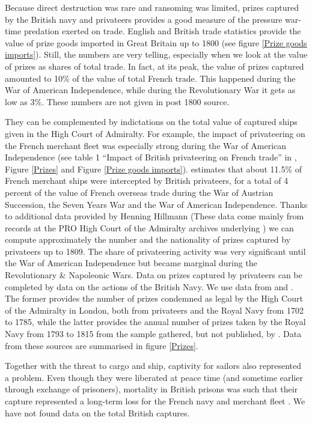\documentclass[12pt,a4paper,notitlepage,english]{article}
\begin{document}
Because direct destruction was rare and ransoming was limited, prizes captured by the British navy and privateers provides a good measure of the pressure war-time predation exerted on trade.
English and British trade statistics provide the value of prize goods imported in Great Britain up to 1800 (see figure \ref{Prize goods imports}).
Still, the numbers are very telling, especially when we look at the value of prizes as shares of total trade.
In fact, at its peak, the value of prizes captured amounted to 10\% of the value of total French trade.
This happened during the War of American Independence, while during the Revolutionary War it gets as low as 3\%.
These numbers are not given in post 1800 source.

They can be complemented by indictations on the total value of captured ships given in the High Court of Admiralty. For example, the impact of privateering on the French merchant fleet was especially strong during the War of American Independence (see table 1 ``Impact of British privateering on French trade'' in \cite{Hillmann2011}, Figure \ref{Prizes} and Figure \ref{Prize goods imports}).
\cite{Hillmann2011} estimates that about 11.5\% of French merchant ships were intercepted by British privateers, for a total of 4 percent of the value of French overseas trade during the War of Austrian Succession, the Seven Years War and the War of American Independence.
Thanks to additional data provided by Henning Hillmann (These data come mainly from records at the PRO High Court of the Admiralty archives underlying \cite{Hillmann2011}) we can compute approximately the number and the nationality of prizes captured by privateers up to 1809.
The share of privateering activity was very significant until the War of American Independence but became marginal during the Revolutionary \& Napoleonic Wars.
Data on prizes captured by privateers can be completed by data on the actions of the British Navy.
We use data from \cite{Starkey1990} and \cite{Benjamin2009}. 
The former provides the number of prizes condemned as legal by the High Court of the Admiralty in London, both from privateers and the Royal Navy from 1702 to 1785, while the latter provides the annual number of prizes taken by the Royal Navy from 1793 to 1815 from the sample gathered, but not published, by \cite{Hill1998}.
Data from these sources are summarised in figure \ref{Prizes}.




Together with the threat to cargo and ship, captivity for sailors also represented a problem. Even though they were liberated at peace time (and sometime earlier through exchange of prisoners), mortality in British prisons was such that their capture represented a long-term loss for the French navy and merchant fleet \citep{LeGoff1998}. We have not found data on the total British captures.
\end{document}
